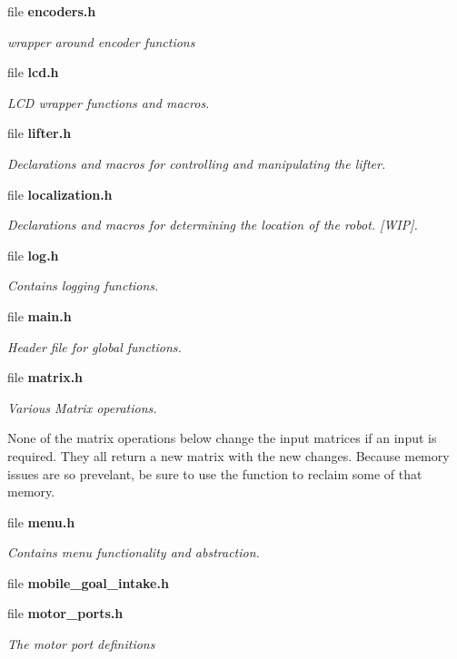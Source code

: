 \begin{DoxyCompactItemize}
file \textbf{ encoders.\+h}
\begin{DoxyCompactList}\small\item\em wrapper around encoder functions \end{DoxyCompactList}\item 
file \textbf{ lcd.\+h}
\begin{DoxyCompactList}\small\item\em L\+CD wrapper functions and macros. \end{DoxyCompactList}\item 
file \textbf{ lifter.\+h}
\begin{DoxyCompactList}\small\item\em Declarations and macros for controlling and manipulating the lifter. \end{DoxyCompactList}\item 
file \textbf{ localization.\+h}
\begin{DoxyCompactList}\small\item\em Declarations and macros for determining the location of the robot. [W\+IP]. \end{DoxyCompactList}\item 
file \textbf{ log.\+h}
\begin{DoxyCompactList}\small\item\em Contains logging functions. \end{DoxyCompactList}\item 
file \textbf{ main.\+h}
\begin{DoxyCompactList}\small\item\em Header file for global functions. \end{DoxyCompactList}\item 
file \textbf{ matrix.\+h}
\begin{DoxyCompactList}\small\item\em Various Matrix operations.

None of the matrix operations below change the input matrices if an input is required. They all return a new matrix with the new changes. Because memory issues are so prevelant, be sure to use the  function to reclaim some of that memory. \end{DoxyCompactList}\item 
file \textbf{ menu.\+h}
\begin{DoxyCompactList}\small\item\em Contains menu functionality and abstraction. \end{DoxyCompactList}\item 
file \textbf{ mobile\+\_\+goal\+\_\+intake.\+h}
\item 
file \textbf{ motor\+\_\+ports.\+h}
\begin{DoxyCompactList}\small\item\em The motor port definitions


\end{DoxyCompactList}
\end{DoxyCompactItemize}
